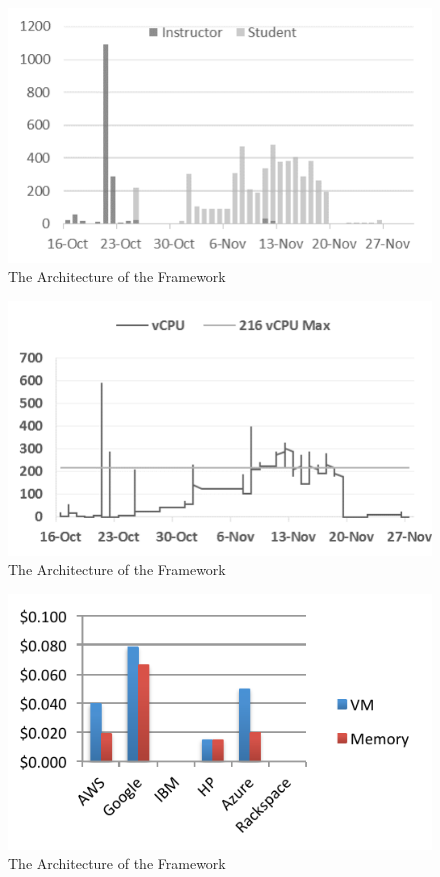 \documentclass{sig-alternate}
\begin{document}
\begin{figure}[htb] 
  \centering 
    \includegraphics[width=1.0\columnwidth]{images/fig4.pdf} 
  \caption{The Architecture of the Framework}\label{F:fig4} 
\end{figure} 

\begin{figure}[htb] 
  \centering 
    \includegraphics[width=1.0\columnwidth]{images/fig5.pdf} 
  \caption{The Architecture of the Framework}\label{F:fig5} 
\end{figure} 

\begin{figure}[htb] 
  \centering 
    \includegraphics[width=1.0\columnwidth]{images/fig6.pdf} 
  \caption{The Architecture of the Framework}\label{F:fig6} 
\end{figure} 
\end{document}
